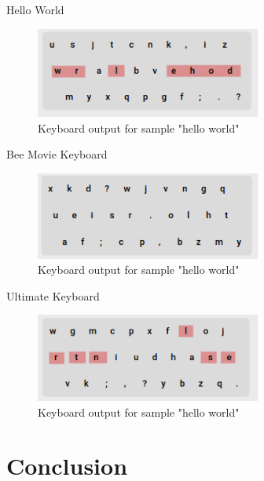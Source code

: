 \documentclass{beamer}
\begin{document}
    \begin{frame}{Hello World}
        \begin{figure}
            \centering
            \includegraphics[width=20em, keepaspectratio]{images/helloWorld.png}
            \caption{Keyboard output for sample "hello world"}
        \end{figure}
    \end{frame}

    \begin{frame}{Bee Movie Keyboard}
        \begin{figure}
            \centering
            \includegraphics[width=20em, keepaspectratio]{images/beeMovieKeyboard.png}
            \caption{Keyboard output for sample "hello world"}
        \end{figure}
    \end{frame}

    \begin{frame}{Ultimate Keyboard}
        \begin{figure}
            \centering
            \includegraphics[width=20em, keepaspectratio]{images/ultimateKeyboard.png}
            \caption{Keyboard output for sample "hello world"}
        \end{figure}
    \end{frame}
    
    \section{Conclusion}
\end{document}
